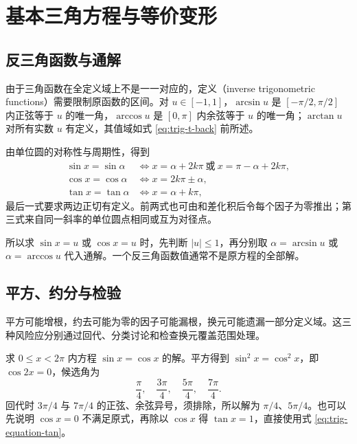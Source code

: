 \documentclass[UTF8]{ctexart}
\begin{document}
\section{基本三角方程与等价变形}
\label{sec:trig-equations}

\subsection{反三角函数与通解}

由于三角函数在全定义域上不是一一对应的，定义（inverse trigonometric functions）需要限制原函数的区间。对 $u\in[-1,1]$，$\arcsin u$ 是 $[-\pi/2,\pi/2]$ 内正弦等于 $u$ 的唯一角，$\arccos u$ 是 $[0,\pi]$ 内余弦等于 $u$ 的唯一角；$\arctan u$ 对所有实数 $u$ 有定义，其值域如式 \eqref{eq:trig-t-back} 前所述。

由单位圆的对称性与周期性，得到
\begin{align}
  \sin x=\sin\alpha
  &\Longleftrightarrow x=\alpha+2k\pi\ \text{或}\ x=\pi-\alpha+2k\pi,
  \label{eq:trig-equation-sin}\\
  \cos x=\cos\alpha
  &\Longleftrightarrow x=2k\pi\pm\alpha,
  \label{eq:trig-equation-cos}\\
  \tan x=\tan\alpha
  &\Longleftrightarrow x=\alpha+k\pi,
  \label{eq:trig-equation-tan}
\end{align}
最后一式要求两边正切有定义。前两式也可由和差化积后令每个因子为零推出；第三式来自同一斜率的单位圆点相同或互为对径点。

所以求 $\sin x=u$ 或 $\cos x=u$ 时，先判断 $|u|\le1$，再分别取 $\alpha=\arcsin u$ 或 $\alpha=\arccos u$ 代入通解。一个反三角函数值通常不是原方程的全部解。

\subsection{平方、约分与检验}

平方可能增根，约去可能为零的因子可能漏根，换元可能遗漏一部分定义域。这三种风险应分别通过回代、分类讨论和检查换元覆盖范围处理。

\begin{example}[平方产生的额外候选解]
求 $0\le x<2\pi$ 内方程 $\sin x=\cos x$ 的解。平方得到 $\sin^2x=\cos^2x$，即 $\cos2x=0$，候选角为
\[
  \frac\pi4,\quad\frac{3\pi}4,\quad\frac{5\pi}4,\quad\frac{7\pi}4.
\]
回代时 $3\pi/4$ 与 $7\pi/4$ 的正弦、余弦异号，须排除，所以解为 $\pi/4$、$5\pi/4$。也可以先说明 $\cos x=0$ 不满足原式，再除以 $\cos x$ 得 $\tan x=1$，直接使用式 \eqref{eq:trig-equation-tan}。
\end{example}
\end{document}
